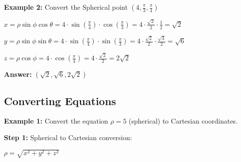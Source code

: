 \documentclass[10pt]{article}                               %
\begin{document}
\begin{adjustwidth}{2em}{0pt}
\begin{adjustwidth}{2em}{0pt}
\begin{examplebox}
                \vspace{1em}

                \textbf{Example 2:} Convert the Spherical point \( \left(4, \frac{\pi}{3}, \frac{\pi}{4}\right) \)
                \vspace{0.5em}

                \begin{adjustwidth}{2em}{0pt}

                    \( x = \rho\sin\phi\cos\theta = 4 \cdot \sin\left(\frac{\pi}{4}\right) \cdot \cos\left(\frac{\pi}{3}\right) = 4 \cdot \frac{\sqrt{2}}{2} \cdot \frac{1}{2} = \sqrt{2} \)

                    \( y = \rho\sin\phi\sin\theta = 4 \cdot \sin\left(\frac{\pi}{4}\right) \cdot \sin\left(\frac{\pi}{3}\right) = 4 \cdot \frac{\sqrt{2}}{2} \cdot \frac{\sqrt{3}}{2} = \sqrt{6} \)

                    \( z = \rho\cos\phi = 4 \cdot \cos\left(\frac{\pi}{4}\right) = 4 \cdot \frac{\sqrt{2}}{2} = 2\sqrt{2} \)

                    \textbf{Answer:} \( \left(\sqrt{2}, \sqrt{6}, 2\sqrt{2}\right) \)

                \end{adjustwidth}

            \end{examplebox}

            \begin{examplebox}
        
                \subsection*{Converting Equations}
            
                \textbf{Example 1:} Convert the equation \( \rho = 5 \) (spherical) to Cartesian coordinates.
                \vspace{0.5em}
            
                \begin{adjustwidth}{2em}{0pt}
            
                    \textbf{Step 1:} Spherical to Cartesian conversion:
            
                    \vspace{0.25em}
            
                    \( \rho = \sqrt{x^2 + y^2 + z^2} \)
            
                    \vspace{0.5em}
            

\end{adjustwidth}
\end{examplebox}
\end{adjustwidth}
\end{adjustwidth}
\end{document}
